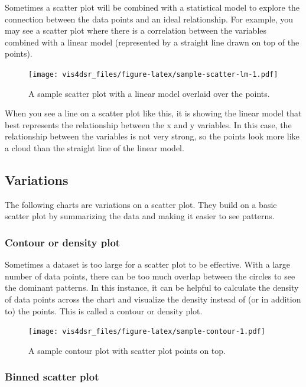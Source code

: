 \documentclass[
]{krantz}
\begin{document}
Sometimes a scatter plot will be combined with a statistical model to explore
the connection between the data points and an ideal relationship. For example, you
may see a scatter plot where there is a correlation between the variables
combined with a linear model (represented by a straight line drawn on top of the points).

\begin{figure}
\centering
\texttt{[image: vis4dsr\_files/figure-latex/sample-scatter-lm-1.pdf]}
\caption{\label{fig:sample-scatter-lm}A sample scatter plot with a linear model overlaid over the points.}
\end{figure}

When you see a line on a scatter plot like this, it is showing the linear model
that best represents the relationship between the x and y variables. In this case,
the relationship between the variables is not very strong, so the points look more
like a cloud than the straight line of the linear model.

\hypertarget{variations-1}{%
\subsection{Variations}\label{variations-1}}

The following charts are variations on a scatter plot. They build on a basic
scatter plot by summarizing the data and making it easier to see patterns.

\hypertarget{contour-or-density-plot}{%
\subsubsection{Contour or density plot}\label{contour-or-density-plot}}

Sometimes a dataset is too large for a scatter plot to be effective. With a large
number of data points, there can be too much overlap between the circles to see
the dominant patterns. In this instance, it can be helpful to calculate the density
of data points across the chart and visualize the density instead of (or in addition to)
the points. This is called a contour or density plot.

\begin{figure}
\centering
\texttt{[image: vis4dsr\_files/figure-latex/sample-contour-1.pdf]}
\caption{\label{fig:sample-contour}A sample contour plot with scatter plot points on top.}
\end{figure}

\hypertarget{binned-scatter-plot}{%
\subsubsection{Binned scatter plot}\label{binned-scatter-plot}}
\end{document}
